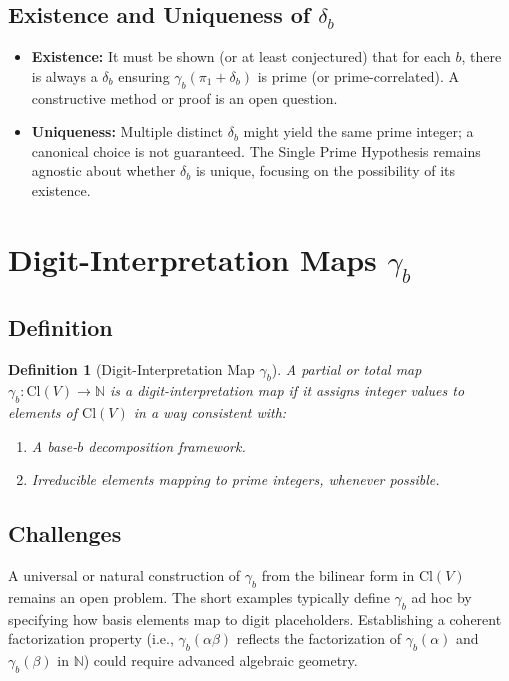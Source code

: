 \documentclass[11pt]{article}
\newtheorem{definition}{Definition}
\begin{document}
\subsection{Existence and Uniqueness of \texorpdfstring{$\delta_b$}{db}}
\begin{itemize}
\item \textbf{Existence:} It must be shown (or at least conjectured) that 
  for each $b$, there is always a $\delta_b$ ensuring $\gamma_b(\pi_1+\delta_b)$ 
  is prime (or prime-correlated). A constructive method or proof is an open question.
\item \textbf{Uniqueness:} Multiple distinct $\delta_b$ might yield the same 
  prime integer; a canonical choice is not guaranteed.  The Single Prime Hypothesis 
  remains agnostic about whether $\delta_b$ is unique, focusing on the possibility 
  of its existence.
\end{itemize}

\section{Digit-Interpretation Maps \texorpdfstring{$\gamma_b$}{gb}}

\subsection{Definition}
\begin{definition}[Digit-Interpretation Map $\gamma_b$]
A partial or total map $\gamma_b:\mathrm{Cl}(V)\to \mathbb{N}$ is a 
\emph{digit-interpretation map} if it assigns integer values to 
elements of $\mathrm{Cl}(V)$ in a way consistent with:
\begin{enumerate}
\item A base-$b$ decomposition framework.
\item Irreducible elements mapping to prime integers, whenever possible.
\end{enumerate}
\end{definition}

\subsection{Challenges}
A universal or natural construction of $\gamma_b$ from the bilinear form 
in $\mathrm{Cl}(V)$ remains an open problem.  The short examples 
typically define $\gamma_b$ ad hoc by specifying how basis elements 
map to digit placeholders. Establishing a coherent factorization property 
(i.e., $\gamma_b(\alpha\beta)$ reflects the factorization of $\gamma_b(\alpha)$ 
and $\gamma_b(\beta)$ in $\mathbb{N}$) could require advanced algebraic geometry.
\end{document}
